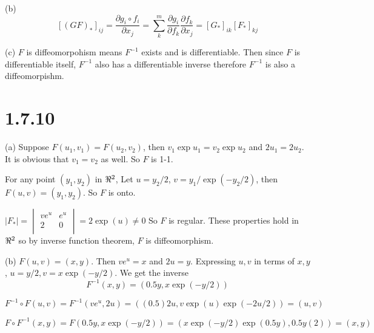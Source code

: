 \documentclass[12pt]{article}
\begin{document}
(b) $$[(GF)_*]_{ij} = \frac{\partial g_i \circ f_i }{\partial x_j} = \sum_k^m \frac{\partial g_i}{\partial f_k} \frac{\partial f_k}{\partial x_j} = [G_*]_{ik}[F_*]_{kj}$$

(c) $F$ is diffeomorpohism means $F^{-1}$ exists and is differentiable. Then since $F$ is differentiable itself, $F^{-1}$ also has a differentiable inverse therefore $F^{-1}$ is also a diffeomorpishm.

\section*{1.7.10}
(a) Suppose $F(u_1, v_1) = F(u_2, v_2)$,  then $ v_1 \exp u_1 = v_2 \exp u_2$ and $2 u_1 = 2u_2$. It is obvious that $v_1 = v_2$ as well. So $F$ is 1-1. 

For any point $(y_1, y_2)$ in $\real^2$,  Let $u = y_2 / 2$, $v = y_1/\exp(-y_2 / 2)$, then $F(u, v) = (y_1, y_2)$. So $F$ is onto.

$|F_*| = \begin{vmatrix}
	ve^u & e^u \\
	2 & 0 \\
\end{vmatrix} = 2\exp(u) \neq 0$ So $F$ is regular. These properties hold in $\real^2$ so by inverse function theorem,  $F$ is diffeomorphism. 

(b) $F(u, v) = (x, y)$. Then $v e^u = x$ and $2u = y$. Expressing $u, v$ in terms of $x,y$,  $u = y/2, v = x \exp(- y/2)$. We get the inverse 
$$ F^{-1}(x, y) = (0.5y, x \exp(-y/2))$$

$F^{-1}\circ F (u, v) = F^{-1}(ve^u, 2u) = ((0.5)2u, v\exp(u) \exp(- 2u / 2)) = (u, v) $

$F \circ F^{-1}(x, y) = F(0.5y, x \exp(-y/2)) = (x\exp(-y/2) \exp(0.5y), 0.5y (2)) = (x, y)$
\end{document}
